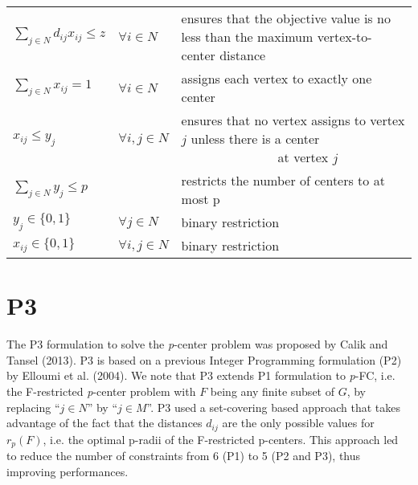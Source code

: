 \renewcommand{\arraystretch}{2}
\begin{tabularx}{\textwidth}{l l X}
$\sum\limits_{j \in N} d_{ij} x_{ij}\leq z$ & $\forall i \in N$ & ensures that the objective value is no less than the maximum vertex-to-center distance \\
$\sum\limits_{j \in N} x_{ij} = 1$ & $\forall i \in N$ & assigns each vertex to exactly one center \\
$x_{ij} \leq y_j$ & $\forall i, j \in N$ & ensures that no vertex assigns to vertex $j$ unless there is a center \ \ \ \ \ \ \ \ \ \ \ \ \ \ \ at vertex $j$ \\
$\sum\limits_{j \in N} y_{j} \leq p$ & & restricts the number of centers to at most p \\
$y_{j} \in \lbrace 0, 1\rbrace$ & $\forall j \in N$ & binary restriction \\
$x_{ij} \in \lbrace 0, 1\rbrace$ & $\forall i, j \in N$ & binary restriction 
\end{tabularx}

\section{P3}
The P3 formulation to solve the \textit{p}-center problem was proposed by Calik and Tansel (2013). P3 is based on a previous Integer Programming formulation (P2) by Elloumi et al. (2004). We note that P3 extends P1 formulation to \textit{p}-FC, i.e. the F-restricted \textit{p}-center problem with $F$ being any finite subset of $G$,  by replacing ``$j \in N$'' by ``$j \in M$''. P3 used a set-covering based approach that takes advantage of the fact that the distances $d_{ij}$ are the only possible values for $r_p(F)$, i.e. the optimal p-radii of the F-restricted p-centers. This approach led to reduce the number of constraints from 6 (P1) to 5 (P2 and P3), thus improving performances. 

